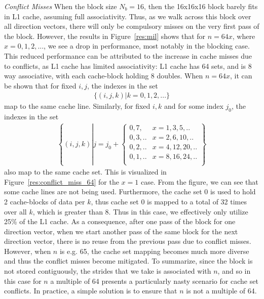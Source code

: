 \documentclass[letterpaper]{article}
\begin{document}

\textit{Conflict Misses}
When the block size $N_b = 16$, then the 16x16x16 block barely fits in L1 cache, assuming full associativity. Thus, as we walk across this block over all direction vectors, there will only be compulsory misses on the very first pass of the block. However, the results in Figure~\ref{res:mil} shows that for $n=64x$, where $x=0,1,2,...$, we see a drop in performance, most notably in the blocking case. This reduced performance can be attributed to the increase in cache misses due to conflicts, as L1 cache has limited associativity: L1 cache has 64 sets, and is 8 way associative, with each cache-block holding 8 doubles. When $n=64x$, it can be shown that for fixed $i,j$, the indexes in the set 
\begin{align}
  \{(i,j,k) | k=0,1,2,... \}
\end{align}
map to the same cache line. Similarly, for fixed $i,k$ and for some index $j_0$, the indexes in the set
\begin{align}
  \left\{(i,j,k) \left| j = j_0 + \begin{cases}
                    0,7, & x=1,3,5,..\\
                    0,3,.. &x=2,6,10,..\\
                    0,2,.. &x=4,12,20,..\\
                    0,1,.. &x=8,16,24,..\\
                              \end{cases}
  \right. \right\}
\end{align}
also map to the same cache set. This is visualized in Figure~\ref{res:conflict_miss_64} for the $x=1$ case. From the figure, we can see that some cache lines are not being used. Furthermore, the cache set 0 is used to hold 2 cache-blocks of data per $k$, thus cache set 0 is mapped to a total of 32 times over all $k$, which is greater than 8. Thus in this case, we effectively only utilize 25\% of the L1 cache. As a consequence, after one pass of the block for one direction vector, when we start another pass of the same block for the next direction vector, there is no reuse from the previous pass due to conflict misses. However, when $n$ is e.g. 65, the cache set mapping becomes much more diverse and thus the conflict misses become mitigated. To summarize, since the block is not stored contiguously, the strides that we take is associated with $n$, and so in this case for $n$ a multiple of 64 presents a particularly nasty scenario for cache set conflicts. In practice, a simple solution is to ensure that $n$ is not a multiple of 64. 
\end{document}
